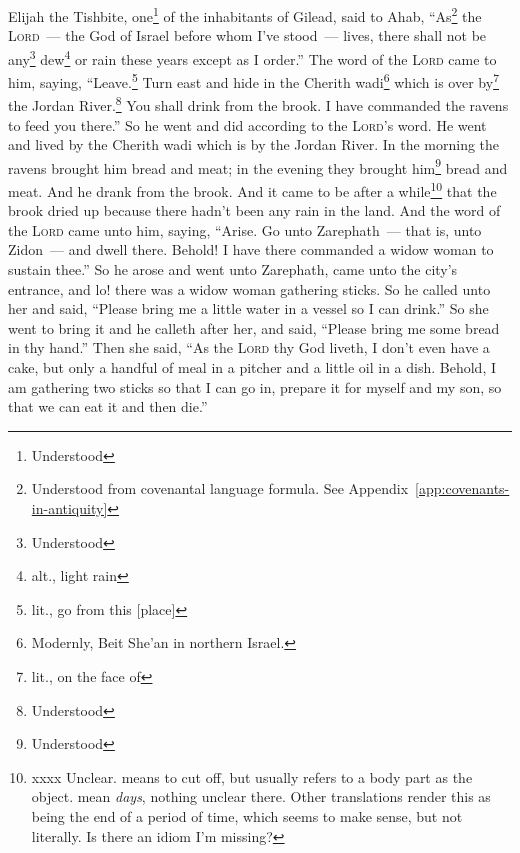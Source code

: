 
\begin{inparaenum}
     Elijah the Tishbite, one\footnote{Understood} of the inhabitants of Gilead, said to Ahab, ``As\footnote{Understood from covenantal language formula. See Appendix~\ref{app:covenants-in-antiquity}} the \textsc{Lord}~--- the God of Israel before whom I've stood~--- lives, there shall not be any\footnote{Understood} dew\footnote{alt., light rain} or rain these years except as I order.''%
     The word of the \textsc{Lord} came to him, saying,%
     ``Leave.\footnote{lit., go from this [place]} Turn east and hide in the Cherith wadi\footnote{Modernly, Beit She'an in northern Israel.} which is over by\footnote{lit., on the face of} the Jordan River.\footnote{Understood}%
     You shall drink from the brook. I have commanded the ravens to feed you there.''%
     So he went and did according to the \textsc{Lord}'s word. He went and lived by the Cherith wadi which is by the Jordan River.%
     In the morning the ravens brought him bread and meat; in the evening they brought him\footnote{Understood} bread and meat. And he drank from the brook.%
     And it came to be after a while\footnote{xxxx Unclear.  means to cut off, but usually refers to a body part as the object.  mean \textit{days}, nothing unclear there. Other translations render this as being the end of a period of time, which seems to make sense, but not literally. Is there an idiom I'm missing?} that the brook dried up because there hadn't been any rain in the land.%
     And the word of the \textsc{Lord} came unto him, saying,%
     ``Arise. Go unto Zarephath~--- that is, unto Zidon~--- and dwell there. Behold! I have there commanded a widow woman to sustain thee.''%
     So he arose and went unto Zarephath, came unto the city's entrance, and lo! there was a widow woman gathering sticks. So he called unto her and said, ``Please bring me a little water in a vessel so I can drink.''%
     So she went to bring it and he calleth after her, and said, ``Please bring me some bread in thy hand.''%
     Then she said, ``As the \textsc{Lord} thy God liveth, I don't even have a cake, but only a handful of meal in a pitcher and a little oil in a dish. Behold, I am gathering two sticks so that I can go in, prepare it for myself and my son, so that we can eat it and then die.''%

\end{inparaenum}
